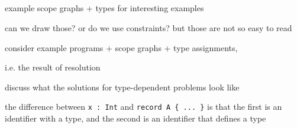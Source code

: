 \subsection{}


    
    example scope graphs + types for interesting examples
    
    can we draw those? or do we use constraints? but those are not so easy to read
    
    consider example programs + scope graphs + type assignments, 
    
i.e. the result of resolution

discuss what the solutions for type-dependent problems look like


the difference between \lstinline+x : Int+ and \lstinline+record A { ... }+ is
that the first is an identifier with a type, and the second is an identifier that defines a type








%
%
%



% 
% 
% 
% 
% 
% 
% 
% 
% 
% 
